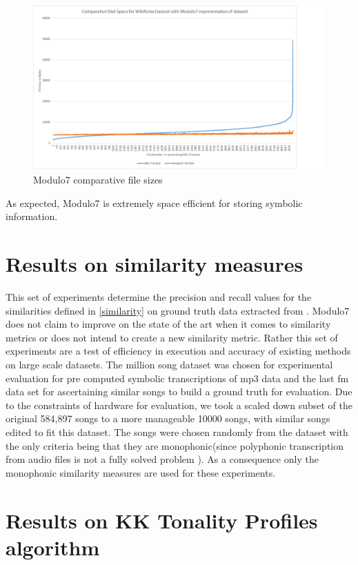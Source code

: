 \begin{figure}
\centering
\includegraphics[width=\textwidth]{M7Graph.png}
\makeatletter
\let\@currsize\normalsize
\caption{Modulo7 comparative file sizes}
\label{fig:figure}
\end{figure}

\noindent As expected, Modulo7 is extremely space efficient for storing symbolic information.
\section{Results on similarity measures}

\noindent This set of experiments determine the precision and recall values for the similarities defined in \ref{similarity} on ground truth data extracted from \cite{msd}. Modulo7 does not claim to improve on the state of the art when it comes to similarity metrics or does not intend to create a new similarity metric. Rather this set of experiments are a test of efficiency in execution and accuracy of existing methods on large scale datasets. The million song dataset was chosen for experimental evaluation \cite{msd} for pre computed symbolic transcriptions of mp3 data and the last fm data set for ascertaining similar songs to build a ground truth for evaluation. Due to the constraints of hardware for evaluation, we took a scaled down subset of the original 584,897 songs to a more manageable 10000 songs, with similar songs edited to fit this dataset. The songs were chosen randomly from the dataset with the only criteria being that they are monophonic(since polyphonic transcription from audio files is not a fully solved problem \cite{melextract}). As a consequence only the monophonic similarity measures are used for these experiments. 

\section{Results on KK Tonality Profiles algorithm}

